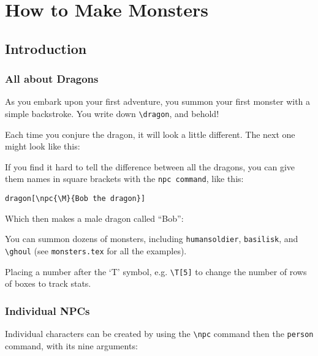 \documentclass[a4paper,openany]{book}
\date{\today}
\begin{document}
\chapter{How to Make Monsters}

\section{Introduction}

\begin{multicols}{2}

\subsection{All about Dragons}

\begin{boxtext}

As you embark upon your first adventure, you summon your first monster with a simple backstroke.
You write down \verb"\dragon", and behold!

\end{boxtext}


Each time you conjure the dragon, it will look a little different.
The next one might look like this:

\dragon

\showNumbers

If you find it hard to tell the difference between all the dragons, you can give them names in square brackets with the \verb"npc command", like this:

\verb"dragon[\npc{\M}{Bob the dragon}]"

Which then makes a male dragon called ``Bob'':


You can summon dozens of monsters, including \verb"humansoldier", \verb"basilisk", and \verb"\ghoul"
(see \verb"monsters.tex" for all the examples).

Placing a number after the `T' symbol, e.g. \verb"\T[5]" to change the number of rows of boxes to track stats.


\subsection{Individual NPCs}

Individual characters can be created by using the \verb"\npc" command then the \verb"person" command, with its nine arguments:


\end{multicols}
\end{document}
